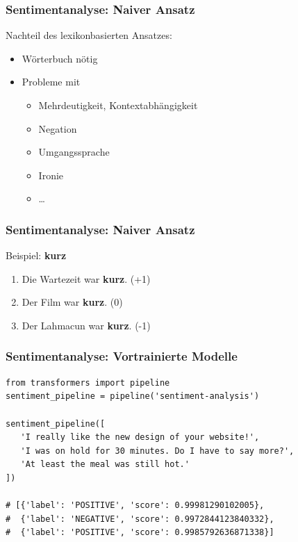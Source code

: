 
\begin{frame}
\frametitle{Sentimentanalyse: Naiver Ansatz}

Nachteil des lexikonbasierten Ansatzes:
\begin{itemize}
	\item Wörterbuch nötig
	\item Probleme mit \begin{itemize}
		\item Mehrdeutigkeit, Kontextabhängigkeit
		\item Negation
		\item Umgangssprache
		\item Ironie
		\item \dots
	\end{itemize}
\end{itemize}
\end{frame}


\begin{frame}
\frametitle{Sentimentanalyse: Naiver Ansatz}

Beispiel: \textbf{kurz}
\begin{enumerate}
	\item Die Wartezeit war \textbf{kurz}. (+1)
	\item Der Film war \textbf{kurz}. (0)
	\item Der Lahmacun war \textbf{kurz}. (-1)
\end{enumerate}
\end{frame}


\begin{frame}[fragile]
\frametitle{Sentimentanalyse: Vortrainierte Modelle}

\begin{verbatim}
from transformers import pipeline
sentiment_pipeline = pipeline('sentiment-analysis')

sentiment_pipeline([
   'I really like the new design of your website!',
   'I was on hold for 30 minutes. Do I have to say more?',
   'At least the meal was still hot.'
])

# [{'label': 'POSITIVE', 'score': 0.99981290102005},
#  {'label': 'NEGATIVE', 'score': 0.9972844123840332},
#  {'label': 'POSITIVE', 'score': 0.9985792636871338}]
\end{verbatim}
\end{frame}

